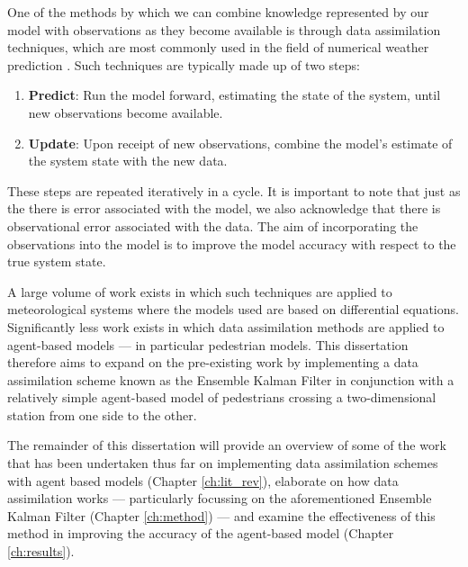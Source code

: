 One of the methods by which we can combine knowledge represented by our model
with observations as they become available is through data assimilation
techniques, which are most commonly used in the field of numerical weather
prediction \citep{kalnay2003atmospheric}.
Such techniques are typically made up of two steps:
\begin{enumerate}
    \item \textbf{Predict}: Run the model forward, estimating the state of the system,
    until new observations become available.
    \item \textbf{Update}: Upon receipt of new observations, combine the model's estimate
    of the system state with the new data.
\end{enumerate}
These steps are repeated iteratively in a cycle.
It is important to note that just as the there is error associated with the
model, we also acknowledge that there is observational error associated with the
data.
The aim of incorporating the observations into the model is to improve the model
accuracy with respect to the true system state.

A large volume of work exists in which such techniques are applied to
meteorological systems where the models used are based on differential
equations.
Significantly less work exists in which data assimilation methods are applied to
agent-based models --- in particular pedestrian models.
This dissertation therefore aims to expand on the pre-existing work by
implementing a data assimilation scheme known as the Ensemble Kalman Filter in
conjunction with a relatively simple agent-based model of pedestrians crossing a
two-dimensional station from one side to the other.

The remainder of this dissertation will provide an overview of some of the work
that has been undertaken thus far on implementing data assimilation schemes with
agent based models (Chapter \ref{ch:lit_rev}), elaborate on how data
assimilation works --- particularly focussing on the aforementioned Ensemble Kalman
Filter (Chapter \ref{ch:method}) --- and examine the effectiveness of this
method in improving the accuracy of the agent-based model (Chapter
\ref{ch:results}).

